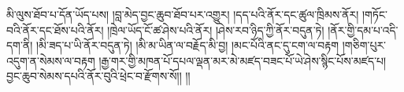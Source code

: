 མི་ལུས་ཐོབ་པ་དོན་ཡོད་པས། །བླ་མེད་བྱང་ཆུབ་ཐོབ་པར་འགྱུར། །དད་པའི་ནོར་དང་ཚུལ་ཁྲིམས་ནོར། །གཏོང་བའི་ནོར་དང་ཐོས་པའི་ནོར། །ཁྲེལ་ཡོད་ངོ་ཚ་ཤེས་པའི་ནོར། །ཤེས་རབ་ཉིད་ཀྱི་ནོར་བདུན་ཏེ། །ནོར་གྱི་དམ་པ་འདི་དག་ནི། །མི་ཟད་པ་ཡི་ནོར་བདུན་ཏེ། །མི་མ་ཡིན་ལ་བརྗོད་མི་བྱ། །མང་པོའི་ནང་དུ་ངག་ལ་བརྟག །གཅིག་པུར་འདུག་ན་སེམས་ལ་བརྟག །རྒྱ་གར་གྱི་མཁན་པོ་དཔལ་ལྡན་མར་མེ་མཛད་བཟང་པོ་ཡེ་ཤེས་སྙིང་པོས་མཛད་པ། བྱང་ཆུབ་སེམས་དཔའི་ནོར་བུའི་ཕྲེང་བ་རྫོགས་སོ།། །།